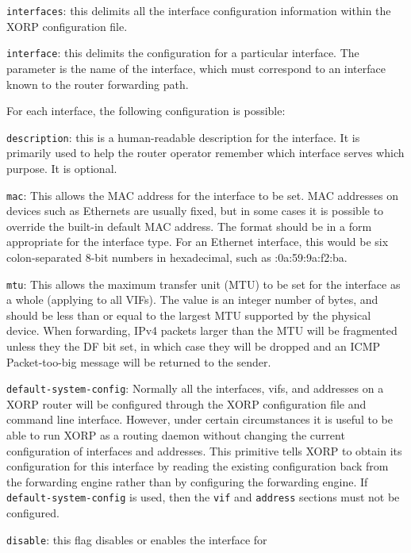 \begin{description}
\item{\tt interfaces}: this delimits all the interface configuration information within the XORP configuration file.
\item{\tt interface}: this delimits the configuration for a particular
  interface.  The parameter is the name of the interface, which must
  correspond to an interface known to the router forwarding path.

  For each interface, the following configuration is possible:
\begin{description}
\item{\tt description}: this is a human-readable description for the
  interface.  It is primarily used to help the router operator
  remember which interface serves which purpose.  It is optional.
\item{\tt mac}: This allows the MAC address for the interface to be
  set.  MAC addresses on devices such as Ethernets are usually fixed,
  but in some cases it is possible to override the built-in default
  MAC address.  The format should be in a form appropriate for the
  interface type.  For an Ethernet interface, this would be six
  colon-separated 8-bit numbers in hexadecimal, such as
  {:0a:59:9a:f2:ba}.
\item{\tt mtu}: This allows the maximum transfer unit (MTU) to be set
  for the interface as a whole (applying to all VIFs).  The value is
  an integer number of bytes, and should be less than or equal to the
  largest MTU supported by the physical device. When forwarding, IPv4
  packets larger than the MTU will be fragmented unless they the DF
  bit set, in which case they will be dropped and an ICMP
  Packet-too-big message will be returned to the sender.
\item{\tt default-system-config}: Normally all the interfaces, vifs,
  and addresses on a XORP router will be configured through the XORP
  configuration file and command line interface.  However, under
  certain circumstances it is useful to be able to run XORP as a
  routing daemon without changing the current configuration of
  interfaces and addresses.  This primitive tells XORP to obtain its
  configuration for this interface by reading the existing
  configuration back from the forwarding engine rather than by
  configuring the forwarding engine.
  If {\tt default-system-config} is used, then the {\tt vif} and
  {\tt address} sections must not be configured. 
\item{\tt disable}: this flag disables or enables the interface for

\end{description}
\end{description}
